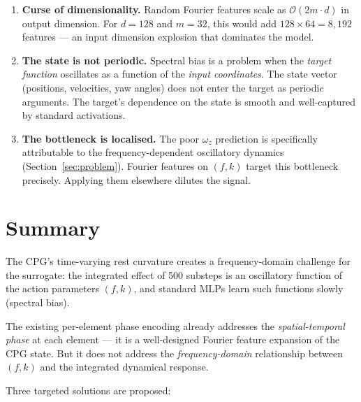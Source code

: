 \documentclass[11pt]{article}
\begin{document}
\begin{enumerate}[label=(\arabic*)]
  \item \textbf{Curse of dimensionality.}
    Random Fourier features scale as $\mathcal{O}(2m \cdot d)$ in output dimension.
    For $d = 128$ and $m = 32$, this would add $128 \times 64 = 8{,}192$ features ---
    an input dimension explosion that dominates the model.

  \item \textbf{The state is not periodic.}
    Spectral bias is a problem when the \emph{target function} oscillates as a
    function of the \emph{input coordinates}.
    The state vector (positions, velocities, yaw angles) does not enter the target
    as periodic arguments.
    The target's dependence on the state is smooth and well-captured by standard
    activations.

  \item \textbf{The bottleneck is localised.}
    The poor $\omega_z$ prediction is specifically attributable to the
    frequency-dependent oscillatory dynamics (Section~\ref{sec:problem}).
    Fourier features on $(f, k)$ target this bottleneck precisely.
    Applying them elsewhere dilutes the signal.
\end{enumerate}

\section{Summary}
\label{sec:summary}

The CPG's time-varying rest curvature creates a frequency-domain challenge for
the surrogate: the integrated effect of 500 substeps is an oscillatory function
of the action parameters $(f, k)$, and standard MLPs learn such functions slowly
(spectral bias).

The existing per-element phase encoding already addresses the
\emph{spatial-temporal phase} at each element --- it is a well-designed Fourier
feature expansion of the CPG state.
But it does not address the \emph{frequency-domain} relationship between
$(f, k)$ and the integrated dynamical response.

Three targeted solutions are proposed:
\end{document}
